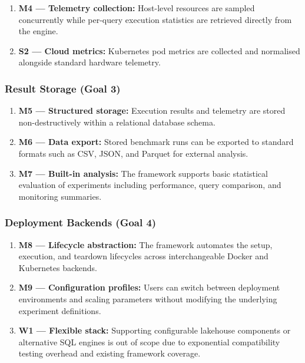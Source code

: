 \documentclass{l4proj}
\begin{document}
\begin{enumerate}
    \item \textbf{M4 --- Telemetry collection:} Host-level resources are sampled concurrently while per-query execution statistics are retrieved directly from the engine.
    \item \textbf{S2 --- Cloud metrics:} Kubernetes pod metrics are collected and normalised alongside standard hardware telemetry.
\end{enumerate}

\subsubsection{Result Storage (Goal 3)}
\label{sec:req_storage}

\begin{enumerate}
    \item \textbf{M5 --- Structured storage:} Execution results and telemetry are stored non-destructively within a relational database schema.
    \item \textbf{M6 --- Data export:} Stored benchmark runs can be exported to standard formats such as CSV, JSON, and Parquet for external analysis.
    \item \textbf{M7 --- Built-in analysis:} The framework supports basic statistical evaluation of experiments including performance, query comparison, and monitoring summaries.
\end{enumerate}

\subsubsection{Deployment Backends (Goal 4)}
\label{sec:req_backends}

\begin{enumerate}
    \item \textbf{M8 --- Lifecycle abstraction:} The framework automates the setup, execution, and teardown lifecycles across interchangeable Docker and Kubernetes backends.
    \item \textbf{M9 --- Configuration profiles:} Users can switch between deployment environments and scaling parameters without modifying the underlying experiment definitions.
    \item \textbf{W1 --- Flexible stack:} Supporting configurable lakehouse components or alternative SQL engines is out of scope due to exponential compatibility testing overhead and existing framework coverage.
\end{enumerate}
\end{document}
